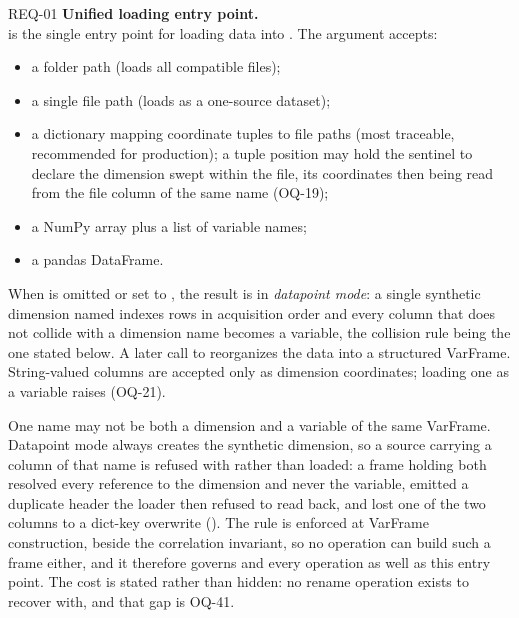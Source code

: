 \begin{reqbox}{REQ-01}{\stable}
\textbf{Unified loading entry point.}\\
 is the single entry point for loading data into
\itc{}. The  argument accepts:
\begin{itemize}[noitemsep,topsep=2pt]
  \item a folder path (loads all compatible files);
  \item a single file path (loads as a one-source dataset);
  \item a dictionary mapping coordinate tuples to file paths (most
    traceable, recommended for production); a tuple position may hold
    the sentinel  to declare the dimension swept within the
    file, its coordinates then being read from the file column of the
    same name (OQ-19);
  \item a NumPy array plus a list of variable names;
  \item a pandas DataFrame.
\end{itemize}
When  is omitted or set to , the result is in
\emph{datapoint mode}: a single synthetic dimension named
 indexes rows in acquisition order and every column
that does not collide with a dimension name becomes a variable, the
collision rule being the one stated below. A later call to
reorganizes the data into a structured VarFrame. String-valued columns
are accepted only as dimension coordinates; loading one as a variable
raises  (OQ-21).

One name may not be both a dimension and a variable of the same
VarFrame. Datapoint mode always creates the synthetic 
dimension, so a source carrying a column of that name is refused with
 rather than loaded: a frame holding both resolved every
reference to the dimension and never the variable, 
emitted a duplicate header the loader then refused to read back, and
 lost one of the two columns to a dict-key overwrite
(). The rule is enforced at VarFrame construction,
beside the correlation invariant, so no operation can build such a frame
either, and it therefore governs  and every operation as
well as this entry point. The cost is stated rather than hidden: no
rename operation exists to recover with, and that gap is OQ-41.


\end{reqbox}
